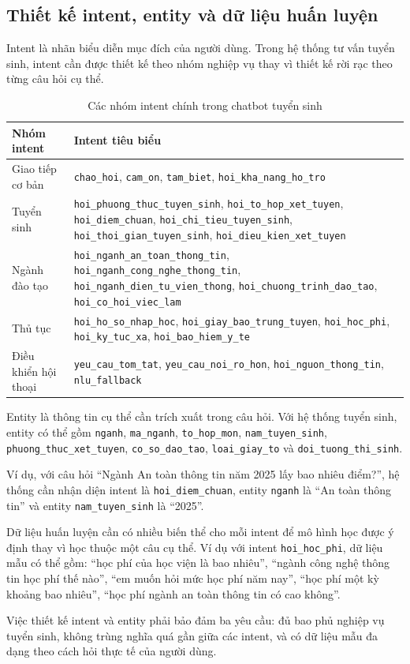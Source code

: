 \subsection{Thiết kế intent, entity và dữ liệu huấn luyện}

Intent là nhãn biểu diễn mục đích của người dùng. Trong hệ thống tư vấn tuyển sinh, intent cần được thiết kế theo nhóm nghiệp vụ thay vì thiết kế rời rạc theo từng câu hỏi cụ thể.

\begin{table}[H]
\centering
\begin{tabular}{|p{4cm}|p{8.5cm}|}
\hline
\textbf{Nhóm intent} & \textbf{Intent tiêu biểu} \\
\hline
Giao tiếp cơ bản & \texttt{chao\_hoi}, \texttt{cam\_on}, \texttt{tam\_biet}, \texttt{hoi\_kha\_nang\_ho\_tro} \\
\hline
Tuyển sinh & \texttt{hoi\_phuong\_thuc\_tuyen\_sinh}, \texttt{hoi\_to\_hop\_xet\_tuyen}, \texttt{hoi\_diem\_chuan}, \texttt{hoi\_chi\_tieu\_tuyen\_sinh}, \texttt{hoi\_thoi\_gian\_tuyen\_sinh}, \texttt{hoi\_dieu\_kien\_xet\_tuyen} \\
\hline
Ngành đào tạo & \texttt{hoi\_nganh\_an\_toan\_thong\_tin}, \texttt{hoi\_nganh\_cong\_nghe\_thong\_tin}, \texttt{hoi\_nganh\_dien\_tu\_vien\_thong}, \texttt{hoi\_chuong\_trinh\_dao\_tao}, \texttt{hoi\_co\_hoi\_viec\_lam} \\
\hline
Thủ tục & \texttt{hoi\_ho\_so\_nhap\_hoc}, \texttt{hoi\_giay\_bao\_trung\_tuyen}, \texttt{hoi\_hoc\_phi}, \texttt{hoi\_ky\_tuc\_xa}, \texttt{hoi\_bao\_hiem\_y\_te} \\
\hline
Điều khiển hội thoại & \texttt{yeu\_cau\_tom\_tat}, \texttt{yeu\_cau\_noi\_ro\_hon}, \texttt{hoi\_nguon\_thong\_tin}, \texttt{nlu\_fallback} \\
\hline
\end{tabular}
\caption{Các nhóm intent chính trong chatbot tuyển sinh}
\label{tab:rasa-intent-groups}
\end{table}

Entity là thông tin cụ thể cần trích xuất trong câu hỏi. Với hệ thống tuyển sinh, entity có thể gồm \texttt{nganh}, \texttt{ma\_nganh}, \texttt{to\_hop\_mon}, \texttt{nam\_tuyen\_sinh}, \texttt{phuong\_thuc\_xet\_tuyen}, \texttt{co\_so\_dao\_tao}, \texttt{loai\_giay\_to} và \texttt{doi\_tuong\_thi\_sinh}.

Ví dụ, với câu hỏi ``Ngành An toàn thông tin năm 2025 lấy bao nhiêu điểm?'', hệ thống cần nhận diện intent là \texttt{hoi\_diem\_chuan}, entity \texttt{nganh} là ``An toàn thông tin'' và entity \texttt{nam\_tuyen\_sinh} là ``2025''.

Dữ liệu huấn luyện cần có nhiều biến thể cho mỗi intent để mô hình học được ý định thay vì học thuộc một câu cụ thể. Ví dụ với intent \texttt{hoi\_hoc\_phi}, dữ liệu mẫu có thể gồm: ``học phí của học viện là bao nhiêu'', ``ngành công nghệ thông tin học phí thế nào'', ``em muốn hỏi mức học phí năm nay'', ``học phí một kỳ khoảng bao nhiêu'', ``học phí ngành an toàn thông tin có cao không''.

Việc thiết kế intent và entity phải bảo đảm ba yêu cầu: đủ bao phủ nghiệp vụ tuyển sinh, không trùng nghĩa quá gần giữa các intent, và có dữ liệu mẫu đa dạng theo cách hỏi thực tế của người dùng.

